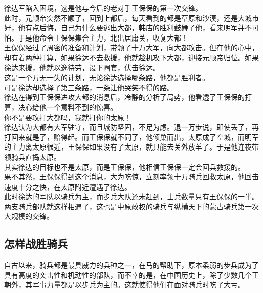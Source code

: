 \begin{multicols}{\theparacolNo}
徐达军陷入困境，这是他与今后的老对手王保保的第一次交锋。\\

此时，元顺帝突然不顺了，回到上都后，每天看到的都是草原和沙漠，还是大城市好，他有点后悔，自己为什么要逃出大都，韩店的胜利鼓舞了他，看来明军并不可怕。于是他命令王保保集合主力，北出居庸关，收复大都！\\

王保保经过了周密的准备和计划，带领了十万大军，向大都攻击。但在他的心中，却有着两种打算，如果徐达不去救援，他就趁机攻下大都，迎接元顺帝归位。如果徐达来援，他就以逸待劳，设下圈套，伏击徐达。\\

这是一个万无一失的计划，无论徐达选择哪条路，他都是胜利者。\\

可是徐达却选择了第三条路，一条让他哭笑不得的路。\\

徐达在得到王保保进攻大都的消息后，冷静的分析了局势，他看透了王保保的打算，决心给他一个意料不到的惊喜。\\

你不是要攻打大都吗，我就打你的太原！\\

徐达认为大都有大军驻守，而且城防坚固，不足为虑。退一万步说，即使丢了，再打回来就是了，赔得起。而王保保就不同了，他倾巢而出，太原成了空城，而明军的主力离太原很近，王保保如果没有了太原，就只能去关外放羊了。于是他连夜带领骑兵直捣太原。\\

其实徐达的目标也不是太原，而是王保保，他相信王保保一定会回兵救援的。\\

果不其然，王保保得到这个消息，大为吃惊，立刻率领十万骑兵回救太原，他回击速度十分之快，在太原附近遭遇了徐达。\\

此时徐达的军队以骑兵为主，而步兵大队还未赶到，士兵数量只有王保保的一半。\\

两支骑兵部队就这样相遇了，这也是中原政权的骑兵与纵横天下的蒙古骑兵第一次大规模的交锋。\\

\subsection{怎样战胜骑兵}
自古以来，骑兵都是最具威力的兵种之一，在马的帮助下，原本柔弱的步兵成为了具有高度的突击性和机动性的部队，而不幸的是，在中国历史上，除了少数几个王朝外，其军事力量都是以步兵为主的。这就使得他们在面对骑兵时吃了大亏。\\


\end{multicols}
